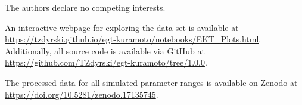 \documentclass[pdflatex,twocolumn,sn-nature,super]{sn-jnl}
\begin{document}

The authors declare no competing interests.

An interactive webpage for exploring the data set is available at
\url{https://tzdyrski.github.io/egt-kuramoto/notebooks/EKT_Plots.html}.
Additionally, all source code is available via GitHub
at \url{https://github.com/TZdyrski/egt-kuramoto/tree/1.0.0}.

The processed data for all simulated parameter ranges
is available on Zenodo at \url{https://doi.org/10.5281/zenodo.17135745}.


\end{document}

